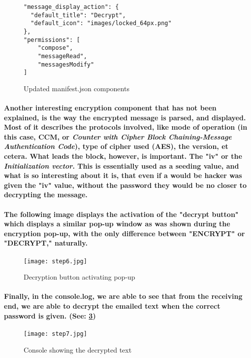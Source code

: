 \begin{figure}[H]
\centering
\begin{verbatim}
"message_display_action": {
  "default_title": "Decrypt",
  "default_icon": "images/locked_64px.png"
},
"permissions": [
    "compose",
    "messageRead",
	"messagesModify"
]
\end{verbatim}
\caption{\label{fig: updateManifest} Updated manifest.json components}
\end{figure}

\paragraph{Another interesting encryption component that has not been explained, is the way the encrypted message is parsed, and displayed. Most of it describes the protocols involved, like mode of operation (in this case, CCM, or \emph{Counter with Cipher Block Chaining-Message Authentication Code}), type of cipher used (AES), the version, et cetera. What leads the block, however, is important. The "iv" or the \emph{Initialization vector}. This is essentially used as a seeding value, and what is so interesting about it is, that even if a would be hacker was given the "iv" value, without the password they would be no closer to decrypting the message.}\cite[p.170]{Schneier}

\paragraph{The following image displays the activation of the "decrypt button" which displays a similar pop-up window as was shown during the encryption pop-up, with the only difference between "ENCRYPT" or "DECRYPT," naturally.}


\begin{figure}[H]
    \centering
    \texttt{[image: step6.jpg]}
    \caption{\label{fig: decrypt1} Decryption button activating pop-up}
\end{figure}

\paragraph{Finally, in the console.log, we are able to see that from the receiving end, we are able to decrypt the emailed text when the correct password is given. (See: \ref{fig: decrypt2})}


\begin{figure}[H]
    \centering
    \texttt{[image: step7.jpg]}
    \caption{\label{fig: decrypt2} Console showing the decrypted text}
\end{figure}

